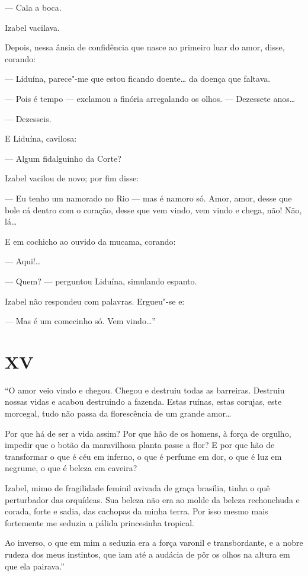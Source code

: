 --- Cala a boca.

Izabel vacilava.

Depois, nessa ânsia de confidência que nasce ao primeiro luar do amor,
disse, corando:

--- Liduína, parece"-me que estou ficando doente\ldots{} da doença que
faltava.

--- Pois é tempo --- exclamou a finória arregalando os olhos. ---
Dezessete anos\ldots{}

--- Dezesseis.

E Liduína, cavilosa:

--- Algum fidalguinho da Corte?

Izabel vacilou de novo; por fim disse:

--- Eu tenho um namorado no Rio --- mas é namoro só. Amor, amor, desse
que bole cá dentro com o coração, desse que vem vindo, vem vindo e
chega, não! Não, lá\ldots{}

E em cochicho ao ouvido da mucama, corando:

--- Aqui!\ldots{}

--- Quem? --- perguntou Liduína, simulando espanto.

Izabel não respondeu com palavras. Ergueu"-se e:

--- Mas é um comecinho só. Vem vindo\ldots{}''

\section*{XV}

``O amor veio vindo e chegou. Chegou e destruiu todas as barreiras.
Destruiu nossas vidas e acabou destruindo a fazenda. Estas ruínas, estas
corujas, este morcegal, tudo não passa da florescência de um grande
amor\ldots{}

Por que há de ser a vida assim? Por que hão de os homens, à força de
orgulho, impedir que o botão da maravilhosa planta passe a flor? E por
que hão de transformar o que é céu em inferno, o que é perfume em dor, o
que é luz em negrume, o que é beleza em caveira?

Izabel, mimo de fragilidade feminil avivada de graça brasília, tinha o
quê perturbador das orquídeas. Sua beleza não era ao molde da beleza
rechonchuda e corada, forte e sadia, das cachopas da minha terra. Por
isso mesmo mais fortemente me seduzia a pálida princesinha tropical.

Ao inverso, o que em mim a seduzia era a força varonil e transbordante,
e a nobre rudeza dos meus instintos, que iam até a audácia de pôr os
olhos na altura em que ela pairava.''

